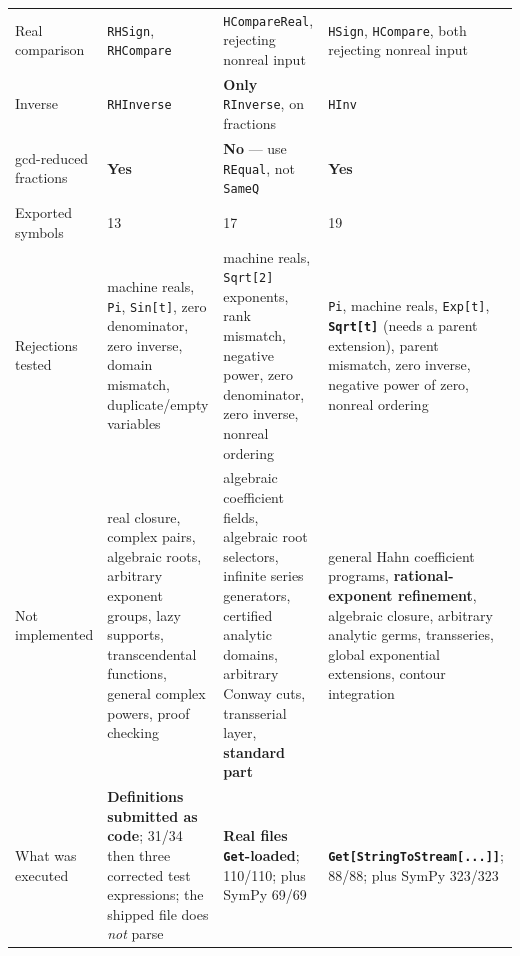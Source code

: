 \documentclass[11pt,letterpaper]{article}
\numberwithin{equation}{section}
\theoremstyle{definition}
\theoremstyle{remark}
\begin{document}
\begin{longtable}{@{}P{0.155\textwidth}P{0.245\textwidth}P{0.245\textwidth}P{0.245\textwidth}@{}}
Real comparison & \texttt{RHSign}, \texttt{RHCompare} &
\texttt{HCompareReal}, rejecting nonreal input &
\texttt{HSign}, \texttt{HCompare}, both rejecting nonreal input\\[0.4em]
Inverse & \texttt{RHInverse} & \textbf{Only} \texttt{RInverse}, on fractions &
\texttt{HInv}\\[0.4em]
gcd-reduced fractions & \textbf{Yes} & \textbf{No} --- use \texttt{REqual}, not
\texttt{SameQ} & \textbf{Yes}\\[0.4em]
Exported symbols & 13 & 17 & 19\\[0.4em]
Rejections tested & machine reals, \texttt{Pi}, \texttt{Sin[t]}, zero
denominator, zero inverse, domain mismatch, duplicate/empty variables &
machine reals, \texttt{Sqrt[2]} exponents, rank mismatch, negative power, zero
denominator, zero inverse, nonreal ordering &
\texttt{Pi}, machine reals, \texttt{Exp[t]}, \textbf{\texttt{Sqrt[t]}} (needs a
parent extension), parent mismatch, zero inverse, negative power of zero,
nonreal ordering\\[0.4em]
Not implemented & real closure, complex pairs, algebraic roots, arbitrary
exponent groups, lazy supports, transcendental functions, general complex
powers, proof checking &
algebraic coefficient fields, algebraic root selectors, infinite series
generators, certified analytic domains, arbitrary Conway cuts, transserial
layer, \textbf{standard part} &
general Hahn coefficient programs, \textbf{rational-exponent refinement},
algebraic closure, arbitrary analytic germs, transseries, global exponential
extensions, contour integration\\[0.4em]
What was executed & \textbf{Definitions submitted as code}; 31/34 then three
corrected test expressions; the shipped file does \emph{not} parse &
\textbf{Real files \texttt{Get}-loaded}; 110/110; plus SymPy 69/69 &
\textbf{\texttt{Get[StringToStream[...]]}}; 88/88; plus SymPy 323/323\\
\bottomrule
\end{longtable}
\endgroup
\end{document}
